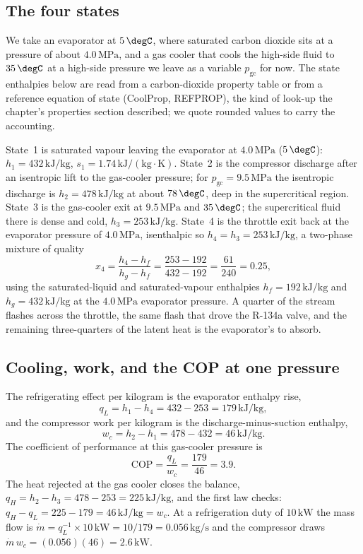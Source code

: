 \subsection{The four states}

We take an evaporator at $5\,\degC$, where saturated carbon dioxide sits at
a pressure of about $4.0\,\text{MPa}$, and a gas cooler that cools the
high-side fluid to $35\,\degC$ at a high-side pressure we leave as a
variable $p_{\text{gc}}$ for now. The state enthalpies below are read from a
carbon-dioxide property table or from a reference equation of state
(CoolProp, REFPROP), the kind of look-up the chapter's properties section
described; we quote rounded values to carry the accounting.

State~1 is saturated vapour leaving the evaporator at $4.0\,\text{MPa}$
($5\,\degC$): $h_1 = 432\,\text{kJ}/\text{kg}$, $s_1 = 1.74\,\text{kJ}/
(\text{kg}\cdot\si{\kelvin})$. State~2 is the compressor discharge after an
isentropic lift to the gas-cooler pressure; for $p_{\text{gc}} =
9.5\,\text{MPa}$ the isentropic discharge is $h_2 = 478\,\text{kJ}/\text{kg}$
at about $78\,\degC$, deep in the supercritical region. State~3 is the
gas-cooler exit at $9.5\,\text{MPa}$ and $35\,\degC$; the supercritical
fluid there is dense and cold, $h_3 = 253\,\text{kJ}/\text{kg}$. State~4 is
the throttle exit back at the evaporator pressure of $4.0\,\text{MPa}$,
isenthalpic so $h_4 = h_3 = 253\,\text{kJ}/\text{kg}$, a two-phase mixture
of quality
\[
x_4 = \frac{h_4 - h_f}{h_g - h_f} = \frac{253 - 192}{432 - 192} =
\frac{61}{240} = 0.25,
\]
using the saturated-liquid and saturated-vapour enthalpies $h_f =
192\,\text{kJ}/\text{kg}$ and $h_g = 432\,\text{kJ}/\text{kg}$ at the
$4.0\,\text{MPa}$ evaporator pressure. A quarter of the stream flashes
across the throttle, the same flash that drove the R-134a valve, and the
remaining three-quarters of the latent heat is the evaporator's to absorb.

\subsection{Cooling, work, and the COP at one pressure}

The refrigerating effect per kilogram is the evaporator enthalpy rise,
\[
q_L = h_1 - h_4 = 432 - 253 = 179\,\text{kJ}/\text{kg},
\]
and the compressor work per kilogram is the discharge-minus-suction
enthalpy,
\[
w_c = h_2 - h_1 = 478 - 432 = 46\,\text{kJ}/\text{kg}.
\]
The coefficient of performance at this gas-cooler pressure is
\[
\text{COP} = \frac{q_L}{w_c} = \frac{179}{46} = 3.9.
\]
The heat rejected at the gas cooler closes the balance, $q_H = h_2 - h_3 =
478 - 253 = 225\,\text{kJ}/\text{kg}$, and the first law checks: $q_H - q_L
= 225 - 179 = 46\,\text{kJ}/\text{kg} = w_c$. At a refrigeration duty of
$10\,\text{kW}$ the mass flow is $\dot{m} = q_L^{-1}\times 10\,\text{kW} =
10/179 = 0.056\,\text{kg}/\text{s}$ and the compressor draws $\dot{m}\,w_c =
(0.056)(46) = 2.6\,\text{kW}$.

